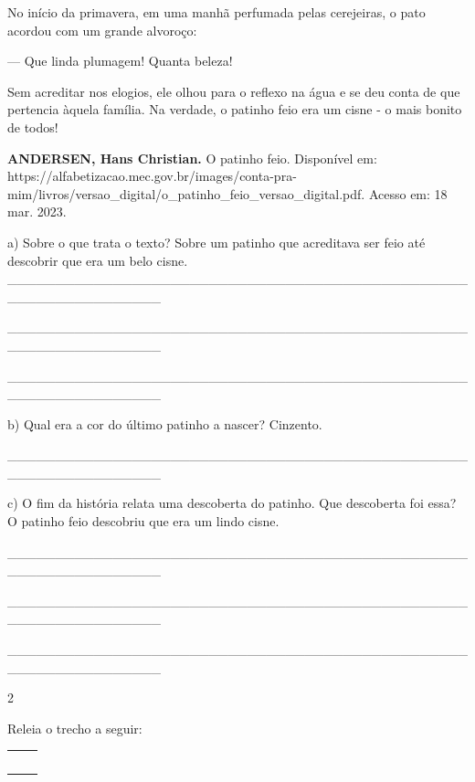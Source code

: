 \begin{escolha}
No início da primavera, em uma manhã perfumada pelas cerejeiras, o pato
acordou com um grande alvoroço:

--- Que linda plumagem! Quanta beleza!

Sem acreditar nos elogios, ele olhou para o reflexo na água e se deu
conta de que pertencia àquela família. Na verdade, o patinho feio era um
cisne - o mais bonito de todos!

\textbf{ANDERSEN, Hans Christian.} O patinho feio. Disponível em:
https://alfabetizacao.mec.gov.br/images/conta-pra-mim/livros/versao\_digital/o\_patinho\_feio\_versao\_digital.pdf.
Acesso em: 18 mar. 2023.

a) Sobre o que trata o texto? Sobre um patinho que acreditava ser feio
até descobrir que era um belo cisne.
\_\_\_\_\_\_\_\_\_\_\_\_\_\_\_\_\_\_\_\_\_\_\_\_\_\_\_\_\_\_\_\_\_\_\_\_\_\_\_\_\_\_\_\_\_\_\_\_\_\_\_\_\_\_\_\_\_\_\_\_\_\_\_\_

\_\_\_\_\_\_\_\_\_\_\_\_\_\_\_\_\_\_\_\_\_\_\_\_\_\_\_\_\_\_\_\_\_\_\_\_\_\_\_\_\_\_\_\_\_\_\_\_\_\_\_\_\_\_\_\_\_\_\_\_\_\_\_\_

\_\_\_\_\_\_\_\_\_\_\_\_\_\_\_\_\_\_\_\_\_\_\_\_\_\_\_\_\_\_\_\_\_\_\_\_\_\_\_\_\_\_\_\_\_\_\_\_\_\_\_\_\_\_\_\_\_\_\_\_\_\_\_\_

b) Qual era a cor do último patinho a nascer? Cinzento.

\_\_\_\_\_\_\_\_\_\_\_\_\_\_\_\_\_\_\_\_\_\_\_\_\_\_\_\_\_\_\_\_\_\_\_\_\_\_\_\_\_\_\_\_\_\_\_\_\_\_\_\_\_\_\_\_\_\_\_\_\_\_\_\_

c) O fim da história relata uma descoberta do patinho. Que descoberta
foi essa? O patinho feio descobriu que era um lindo cisne.

\_\_\_\_\_\_\_\_\_\_\_\_\_\_\_\_\_\_\_\_\_\_\_\_\_\_\_\_\_\_\_\_\_\_\_\_\_\_\_\_\_\_\_\_\_\_\_\_\_\_\_\_\_\_\_\_\_\_\_\_\_\_\_\_

\protect\hypertarget{_Hlk130128820}{}{}\_\_\_\_\_\_\_\_\_\_\_\_\_\_\_\_\_\_\_\_\_\_\_\_\_\_\_\_\_\_\_\_\_\_\_\_\_\_\_\_\_\_\_\_\_\_\_\_\_\_\_\_\_\_\_\_\_\_\_\_\_\_\_\_

\_\_\_\_\_\_\_\_\_\_\_\_\_\_\_\_\_\_\_\_\_\_\_\_\_\_\_\_\_\_\_\_\_\_\_\_\_\_\_\_\_\_\_\_\_\_\_\_\_\_\_\_\_\_\_\_\_\_\_\_\_\_\_\_

\num{2}

Releia o trecho a seguir:

\begin{longtable}[]{@{}l@{}}
\toprule
\begin{minipage}[t]{0.97\columnwidth}\raggedright\strut
~ ~


\end{minipage}
\end{longtable}
\end{escolha}
